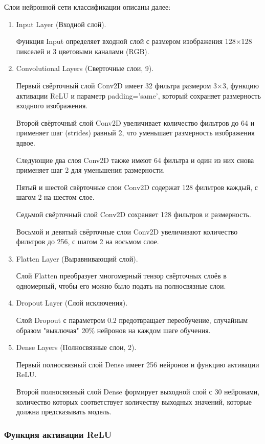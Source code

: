 Слои нейронной сети классификации описаны далее:

\begin{enumerate}
\item Input Layer (Входной слой).

Функция Input определяет входной слой с размером изображения 128×128 пикселей и 3 цветовыми каналами (RGB).
\item Convolutional Layers (Сверточные слои, 9).

Первый свёрточный слой Conv2D имеет 32 фильтра размером 3×3, функцию активации ReLU и параметр padding='same', который сохраняет размерность входного изображения.

Второй свёрточный слой Conv2D увеличивает количество фильтров до 64 и применяет шаг (strides) равный 2, что уменьшает размерность изображения вдвое.

Следующие два слоя Conv2D также имеют 64 фильтра и один из них снова применяет шаг 2 для уменьшения размерности.

Пятый и шестой свёрточные слои Conv2D содержат 128 фильтров каждый, с шагом 2 на шестом слое.

Седьмой свёрточный слой Conv2D сохраняет 128 фильтров и размерность.

Восьмой и девятый свёрточные слои Conv2D увеличивают количество фильтров до 256, с шагом 2 на восьмом слое.
\item Flatten Layer (Выравнивающий слой).

Слой Flatten преобразует многомерный тензор свёрточных слоёв в одномерный, чтобы его можно было подать на полносвязные слои.
\item Dropout Layer (Слой исключения).

Слой Dropout с параметром 0.2 предотвращает переобучение, случайным образом "выключая" 20\% нейронов на каждом шаге обучения.
\item Dense Layers (Полносвязные слои, 2).

Первый полносвязный слой Dense имеет 256 нейронов и функцию активации ReLU.

Второй полносвязный слой Dense формирует выходной слой с 30 нейронами, количество которых соответствует количеству выходных значений, которые должна предсказывать модель.
\end{enumerate}

\subsubsection{Функция активации ReLU}


